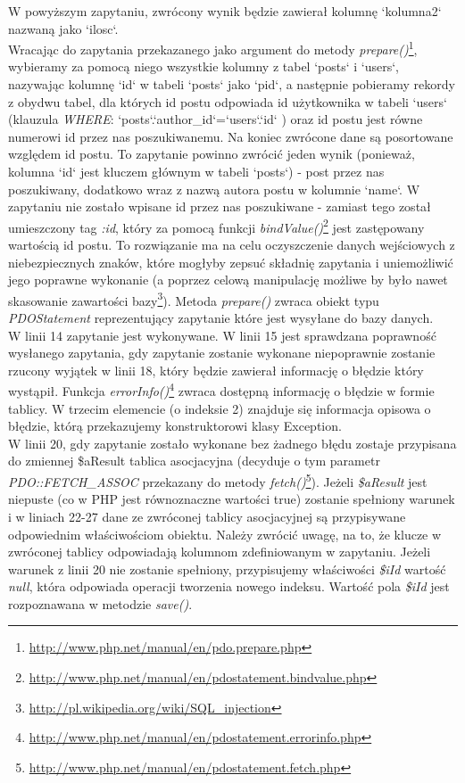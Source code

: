 \documentclass[a4paper,10pt]{article}
\begin{document}
W powyższym zapytaniu, zwrócony wynik będzie zawierał kolumnę `kolumna2` nazwaną jako `ilosc`. \\
Wracając do zapytania przekazanego jako argument do metody \textit{prepare()}\footnote{\href{http://www.php.net/manual/en/pdo.prepare.php}{http://www.php.net/manual/en/pdo.prepare.php}}, wybieramy za pomocą niego wszystkie kolumny z tabel `posts` i `users`, nazywając kolumnę `id` w tabeli `posts` jako `pid`, a następnie pobieramy rekordy z obydwu tabel, dla których id postu odpowiada id użytkownika w tabeli `users` (klauzula \textit{WHERE}: `posts`.`author\_id`=`users`.`id` ) oraz id postu jest równe numerowi id przez nas poszukiwanemu. Na koniec zwrócone dane są posortowane względem id postu. To zapytanie powinno zwrócić jeden wynik (ponieważ, kolumna `id` jest kluczem głównym w tabeli `posts`) - post przez nas poszukiwany, dodatkowo wraz z nazwą autora postu w kolumnie `name`. W zapytaniu nie zostało wpisane id przez nas poszukiwane - zamiast tego został umieszczony tag \textit{:id}, który za pomocą funkcji \textit{bindValue()}\footnote{\href{http://www.php.net/manual/en/pdostatement.bindvalue.php}{http://www.php.net/manual/en/pdostatement.bindvalue.php}} jest zastępowany wartością id postu. To rozwiązanie ma na celu oczyszczenie danych wejściowych z niebezpiecznych znaków, które mogłyby zepsuć składnię zapytania i uniemożliwić jego poprawne wykonanie (a poprzez celową manipulację możliwe by było nawet skasowanie zawartości bazy\footnote{\href{http://pl.wikipedia.org/wiki/SQL_injection}{http://pl.wikipedia.org/wiki/SQL\_injection}}). Metoda \textit{prepare()} zwraca obiekt typu \textit{PDOStatement} reprezentujący zapytanie które jest wysyłane do bazy danych. \\
W linii 14 zapytanie jest wykonywane. W linii 15 jest sprawdzana poprawność wysłanego zapytania, gdy zapytanie zostanie wykonane niepoprawnie zostanie rzucony wyjątek w linii 18, który będzie zawierał informację o błędzie który wystąpił. Funkcja \textit{errorInfo()}\footnote{\href{http://www.php.net/manual/en/pdostatement.errorinfo.php}{http://www.php.net/manual/en/pdostatement.errorinfo.php}} zwraca dostępną informację o błędzie w formie tablicy. W trzecim elemencie (o indeksie 2) znajduje się informacja opisowa o błędzie, którą przekazujemy konstruktorowi klasy Exception. \\
W linii 20, gdy zapytanie zostało wykonane bez żadnego błędu zostaje przypisana do zmiennej \$aResult tablica asocjacyjna (decyduje o tym parametr \textit{PDO::FETCH\_ASSOC} przekazany do metody \textit{fetch()}\footnote{\href{http://www.php.net/manual/en/pdostatement.fetch.php}{http://www.php.net/manual/en/pdostatement.fetch.php}}). Jeżeli \textit{\$aResult} jest niepuste (co w PHP jest równoznaczne wartości true) zostanie spełniony warunek i w liniach 22-27 dane ze zwróconej tablicy asocjacyjnej są przypisywane odpowiednim właściwościom obiektu. Należy zwrócić uwagę, na to, że klucze w zwróconej tablicy odpowiadają kolumnom zdefiniowanym w zapytaniu. Jeżeli warunek z linii 20 nie zostanie spełniony, przypisujemy właściwości \textit{\$iId} wartość \textit{null}, która odpowiada operacji tworzenia nowego indeksu. Wartość pola \textit{\$iId} jest rozpoznawana w metodzie \textit{save()}. \\
\end{document}

